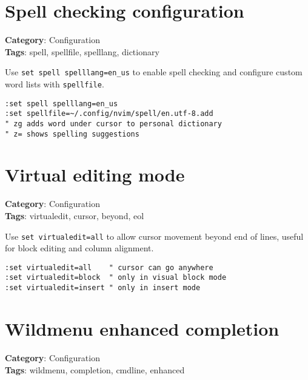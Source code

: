 \section{Spell checking configuration}

\textbf{Category}: Configuration\\ \textbf{Tags}: spell, spellfile, spelllang, dictionary
\vspace{0.5cm}

Use {\footnotesize \Verb§set spell spelllang=en_us§} to enable spell checking and configure custom word lists with {\footnotesize \Verb§spellfile§}.

\begin{Exa*}{}
\begin{Verbatim}[fontsize=\footnotesize, breaklines, breakanywhere]
:set spell spelllang=en_us
:set spellfile=~/.config/nvim/spell/en.utf-8.add
" zg adds word under cursor to personal dictionary
" z= shows spelling suggestions
\end{Verbatim}
\end{Exa*}

\section{Virtual editing mode}

\textbf{Category}: Configuration\\ \textbf{Tags}: virtualedit, cursor, beyond, eol
\vspace{0.5cm}

Use {\footnotesize \Verb§set virtualedit=all§} to allow cursor movement beyond end of lines, useful for block editing and column alignment.

\begin{Exa*}{}
\begin{Verbatim}[fontsize=\footnotesize, breaklines, breakanywhere]
:set virtualedit=all    " cursor can go anywhere
:set virtualedit=block  " only in visual block mode
:set virtualedit=insert " only in insert mode
\end{Verbatim}
\end{Exa*}

\section{Wildmenu enhanced completion}

\textbf{Category}: Configuration\\ \textbf{Tags}: wildmenu, completion, cmdline, enhanced
\vspace{0.5cm}

